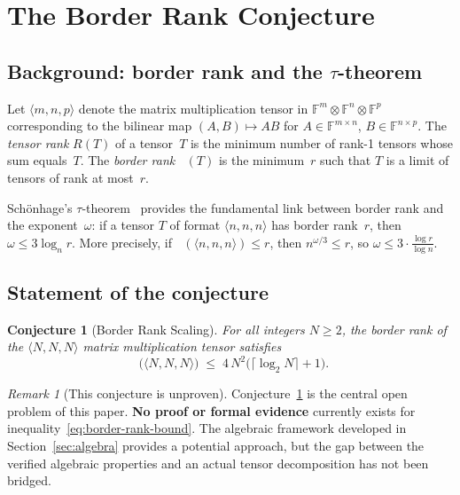 \documentclass[11pt,a4paper]{article}
\newtheorem{conjecture}{Conjecture}[section]
\theoremstyle{definition}
\theoremstyle{remark}
\newtheorem{remark}[theorem]{Remark}
\DeclareMathOperator{\brank}{\underline{R}}
\newcommand{\mmtensor}[3]{\langle #1, #2, #3 \rangle}
\begin{document}
\section{The Border Rank Conjecture}\label{sec:border-rank}

\subsection{Background: border rank and the $\tau$-theorem}

Let $\mmtensor{m}{n}{p}$ denote the matrix multiplication tensor
in $\mathbb{F}^m \otimes \mathbb{F}^n \otimes \mathbb{F}^p$
corresponding to the bilinear map
$(A, B) \mapsto AB$ for $A \in \mathbb{F}^{m \times n}$,
$B \in \mathbb{F}^{n \times p}$.
The \emph{tensor rank} $R(T)$ of a tensor~$T$ is the minimum number of
rank-1 tensors whose sum equals~$T$. The \emph{border rank}
$\brank(T)$ is the minimum~$r$ such that $T$ is a limit of
tensors of rank at most~$r$.

Sch\"onhage's $\tau$-theorem~\cite{Schonhage1981} provides the
fundamental link between border rank and the exponent~$\omega$:
if a tensor $T$ of format $\mmtensor{n}{n}{n}$ has border rank~$r$,
then $\omega \le 3 \log_n r$. More precisely, if
$\brank(\mmtensor{n}{n}{n}) \le r$, then $n^{\omega/3} \le r$,
so $\omega \le 3 \cdot \frac{\log r}{\log n}$.

\subsection{Statement of the conjecture}

\begin{conjecture}[Border Rank Scaling]\label{conj:border-rank}
For all integers $N \ge 2$, the border rank of the
$\mmtensor{N}{N}{N}$ matrix multiplication tensor satisfies
\begin{equation}\label{eq:border-rank-bound}
  \brank\bigl(\mmtensor{N}{N}{N}\bigr)
  \;\le\; 4\,N^2\bigl(\lceil \log_2 N \rceil + 1\bigr).
\end{equation}
\end{conjecture}

\begin{remark}[This conjecture is unproven]\label{rem:unproven}
Conjecture~\ref{conj:border-rank} is the central open problem of this
paper. \textbf{No proof or formal evidence} currently exists for
inequality~\eqref{eq:border-rank-bound}. The algebraic framework
developed in Section~\ref{sec:algebra} provides a potential approach,
but the gap between the verified algebraic properties and an actual
tensor decomposition has not been bridged.
\end{remark}
\end{document}
